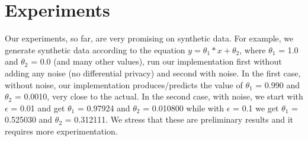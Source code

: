 \documentclass[sigplan,screen]{acmart}
\begin{document}
\section{Experiments}
Our experiments, so far, are very promising on synthetic data. For example, we generate 
synthetic data according to the equation $y = \theta_{1} * x + \theta_{2}$, 
where $\theta_{1}$ = 1.0 and $\theta_{2}$ = 0.0 (and many other values), 
run our implementation first without adding any noise (no differential privacy)
and second with noise. In the first case, without noise, our implementation 
produces/predicts the value of $\theta_{1}$ = 0.990 and $\theta_{2}$ = 0.0010, very 
close to the actual. In the second case, with noise, we start with $\epsilon$ = 0.01
and get $\theta_{1}$ = 0.97924 and $\theta_{2}$ =  0.010800 while with 
$\epsilon$ = 0.1 we get $\theta_{1}$ = 0.525030 and $\theta_{2}$ = 0.312111.
We stress that these are preliminary results and it requires more experimentation.



\begin{comment}


\section{Related Work}
while \cite{hynes2018efficient} addresses 
 --by adding more complexity and thus hampering the performance 
 (cite some paper on performance penalty)--
 the side channel by data-oblivious \cite{ohrimenko2016oblivious} algorithm. 

\section{Future Work}

\begin{itemize}
    \item Writing bindings for Intel SGX
    \item Turning it into Federated Learning
    \item Running More experiments (the defacto one from machine learning community)
    \item 
\end{itemize}
\end{comment}




\end{document}
